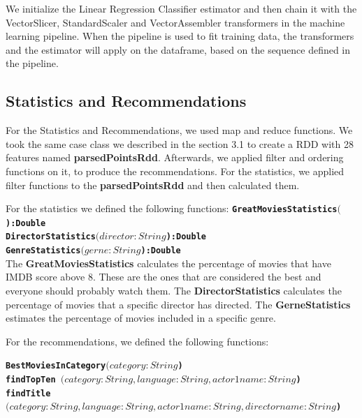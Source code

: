 \documentclass[letterpaper,twocolumn,10pt]{article}
\begin{document}
We initialize the Linear Regression Classifier estimator and then chain it with the VectorSlicer, StandardScaler and VectorAssembler transformers in the machine learning pipeline. When the pipeline is used to fit training data, the transformers and the estimator will apply on the dataframe, based on the sequence defined in the pipeline.\par 

\subsection{Statistics and Recommendations}

For the Statistics and Recommendations, we used map and reduce functions. We took the same case class we described in the section 3.1 to create a RDD with 28 features named \textbf{parsedPointsRdd}. Afterwards, we applied filter and ordering functions on it, to produce the recommendations. For the statistics, we applied filter functions to the \textbf{parsedPointsRdd} and then calculated them. \par 

For the statistics we defined the following functions:
\noindent
{\bf \tt GreatMoviesStatistics\((\)):Double } \\ 

\noindent
{\bf \tt DirectorStatistics\((director:String\)):Double } \\ 

\noindent
{\bf \tt GenreStatistics\((gerne:String\)):Double } \\ 

The \textbf{GreatMoviesStatistics} calculates the percentage of movies that have IMDB score above 8. These are the ones that are considered the best and everyone should probably watch them. The \textbf{DirectorStatistics} calculates the percentage of movies that a specific director has directed. The \textbf{GerneStatistics} estimates the percentage of movies included in a specific genre. \par


For the recommendations, we defined the following functions:

\noindent
{\bf \tt BestMoviesInCategory\((category:String\)) } \\

\noindent
{\bf \tt findTopTen  \((category:String,language:String,actor1name:String\)) } \\

\noindent
{\bf \tt findTitle\((category:String, language:String, actor1name:String, directorname:String\)) } \\
\end{document}
